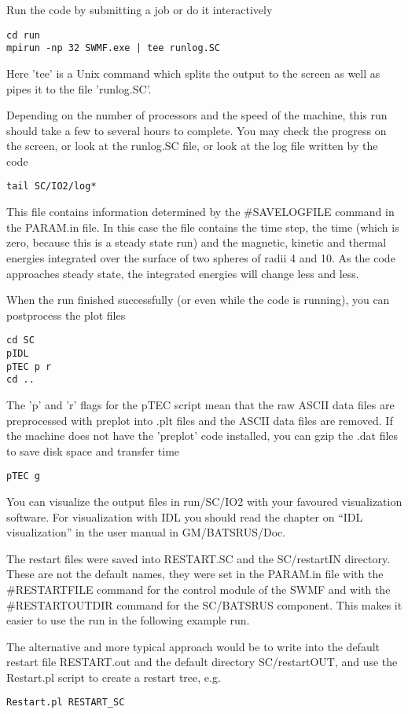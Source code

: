 Run the code by submitting a job or do it interactively
\begin{verbatim}
cd run
mpirun -np 32 SWMF.exe | tee runlog.SC
\end{verbatim}
Here 'tee' is a Unix command which splits the output to the screen as
well as pipes it to the file 'runlog.SC'. 

Depending on the number of processors and the speed of the machine,
this run should take a few to several hours to complete.
You may check the progress on the screen, or look at the 
runlog.SC file, or look at the log file written by the code
\begin{verbatim}
tail SC/IO2/log*
\end{verbatim}
This file contains information determined by the \#SAVELOGFILE command
in the PARAM.in file. In this case the file contains the time step, the
time (which is zero, because this is a steady state run) and the
magnetic, kinetic and thermal energies integrated over the surface of 
two spheres of radii 4 and 10. As the code approaches steady state,
the integrated energies will change less and less. 

When the run finished successfully (or even while the code is running), 
you can postprocess the plot files
\begin{verbatim}
cd SC
pIDL
pTEC p r
cd ..
\end{verbatim}
The 'p' and 'r' flags for the pTEC script mean that the raw ASCII data
files are preprocessed with preplot into .plt files and the ASCII data
files are removed. If the machine does not have the 'preplot' code installed,
you can gzip the .dat files to save disk space and transfer time
\begin{verbatim}
pTEC g
\end{verbatim}
You can visualize the output files in run/SC/IO2 with your favoured 
visualization software. For visualization with IDL you should read the
chapter on ``IDL visualization'' in the user manual in GM/BATSRUS/Doc.

The restart files were saved into RESTART.SC and the SC/restartIN directory.
These are not the default names, they were set in the PARAM.in file with
the \#RESTARTFILE command for the control module of the SWMF and 
with the \#RESTARTOUTDIR command for the SC/BATSRUS component.
This makes it easier to use the run in the following example run.

The alternative and more typical approach would be to write into the
default restart file RESTART.out and the default directory SC/restartOUT,
and use the Restart.pl script to create a restart tree, e.g.
\begin{verbatim}
Restart.pl RESTART_SC
\end{verbatim}

